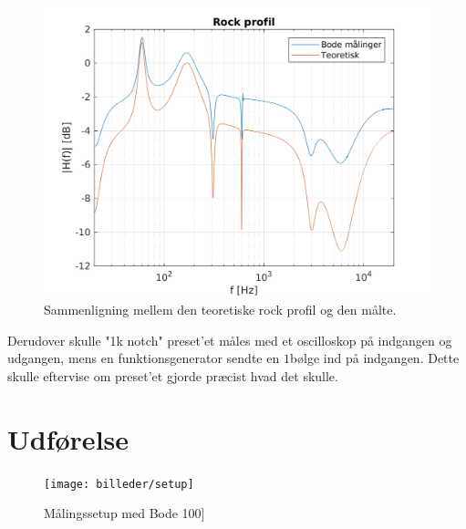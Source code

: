 \begin{figure}[h]
\includegraphics[]{matlabdemo/test/eq_rock.png}
\caption{Sammenligning mellem den teoretiske rock profil og den målte.}
\end{figure}



Derudover skulle "1k notch" preset'et måles med et oscilloskop på indgangen og udgangen, mens en funktionsgenerator sendte en $1$\kilo\hertz bølge ind på indgangen. Dette skulle eftervise om preset'et gjorde præcist hvad det skulle. \\

\section{Udførelse}
\begin{figure}[h!]
	\centering
	\texttt{[image: billeder/setup]}
	\caption{Målingssetup med Bode 100]}
	\label{fig:bode100}
\end{figure}

